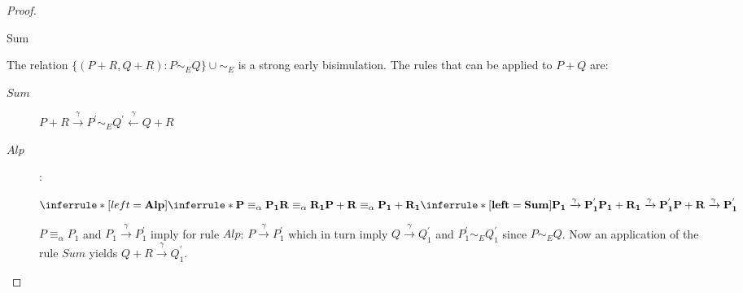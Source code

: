 \begin{lemma}
\begin{proof}
\begin{description}
	\end{description}
    \begin{description}
      \item[Sum]
    \end{description}
	The relation $\{(P+R, Q+R): P\sim_{E} Q\} \cup \sim_{E}$ is a strong early bisimulation. The rules that can be applied to $P+Q$ are:
	\begin{description}
	  \item[$Sum$]
	    $P+R \xrightarrow{\gamma} P^{'} \sim_{E} Q^{'} \stackrel{\gamma}{\longleftarrow} Q+R$
	  \item[$Alp$]:
	    \begin{center}
	      $\inferrule* [left=\bf{Alp}]{
		  \inferrule* {
		      P \equiv_{\alpha} P_{1}
		    \\
		      R \equiv_{\alpha} R_{1}
		  }{
		    P+R \equiv_{\alpha} P_{1}+R_{1}
		  }
		\\
		  \inferrule* [left=\bf{Sum}]{
		    P_{1} \xrightarrow{\gamma} P_{1}^{'}
		  }{
		    P_{1}+R_{1} \xrightarrow{\gamma} P_{1}^{'}
		  }
	      }{
		  P+R \xrightarrow{\gamma} P_{1}^{'}
	      }$
	    \end{center}
	    $P\equiv_{\alpha} P_{1}$ and $P_{1} \xrightarrow{\gamma} P_{1}^{'}$ imply for rule $Alp$: $P \xrightarrow{\gamma} P_{1}^{'}$ which in turn imply $Q \xrightarrow{\gamma} Q_{1}^{'}$ and $P_{1}^{'} \sim_{E} Q_{1}^{'}$ since $P\sim_{E}Q$. Now an application of the rule $Sum$ yields $Q+R \xrightarrow{\gamma} Q_{1}^{'}$.

\end{description}
\end{proof}
\end{lemma}
